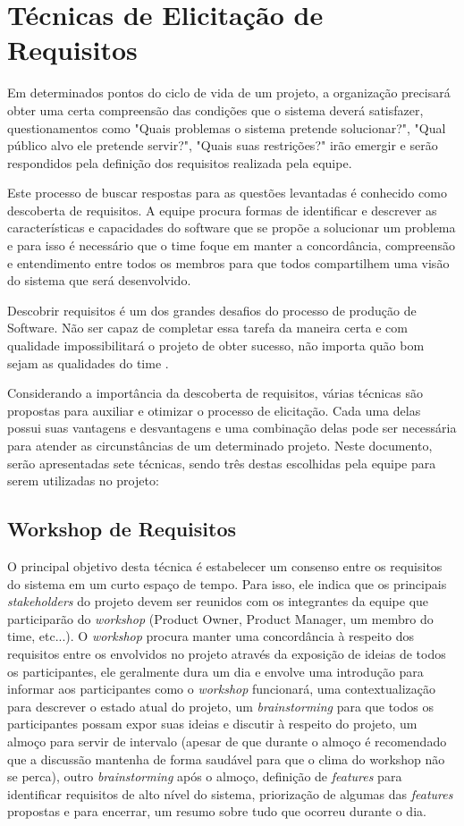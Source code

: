 \chapter[Técnicas de Elicitação de Requisitos]{Técnicas de Elicitação de Requisitos}
Em determinados pontos do ciclo de vida de um projeto, a organização precisará obter uma certa compreensão das condições que o sistema deverá satisfazer, questionamentos como "Quais problemas o sistema pretende solucionar?", "Qual público alvo ele pretende servir?", "Quais suas restrições?" irão emergir e serão respondidos pela definição dos requisitos realizada pela equipe.

Este processo de buscar respostas para as questões levantadas é conhecido como descoberta de requisitos. A equipe procura formas de identificar e descrever as características e capacidades do software que se propõe a solucionar um problema e para isso é necessário que o time foque em manter a concordância, compreensão e entendimento entre todos os membros para que todos compartilhem uma visão do sistema que será desenvolvido.

Descobrir requisitos é um dos grandes desafios do processo de produção de Software. Não ser capaz de completar essa tarefa da maneira certa e com qualidade impossibilitará o projeto de obter sucesso, não importa quão bom sejam as qualidades do time \cite[p. 227-228]{safe001}.

Considerando a importância da descoberta de requisitos, várias técnicas são propostas para auxiliar e otimizar o processo de elicitação. Cada uma delas possui suas vantagens e desvantagens e uma combinação delas pode ser necessária para atender as circunstâncias de um determinado projeto. Neste documento, serão apresentadas sete técnicas, sendo três destas escolhidas pela equipe para serem utilizadas no projeto:

\section{Workshop de Requisitos}
O principal objetivo desta técnica é estabelecer um consenso entre os requisitos do sistema em um curto espaço de tempo. Para isso, ele indica que os principais \emph{stakeholders} do projeto devem ser reunidos com os integrantes da equipe que participarão do \emph{workshop} (Product Owner, Product Manager, um membro do time, etc...). O \emph{workshop} procura manter uma concordância à respeito dos requisitos entre os envolvidos no projeto através da exposição de ideias de todos os participantes, ele geralmente dura um dia e envolve uma introdução para informar aos participantes como o \emph{workshop} funcionará, uma contextualização para descrever o estado atual do projeto, um \emph{brainstorming} para que todos os participantes possam expor suas ideias e discutir à respeito do projeto, um almoço para servir de intervalo (apesar de que durante o almoço é recomendado que a discussão mantenha de forma saudável para que o clima do workshop não se perca), outro \emph{brainstorming} após o almoço, definição de \emph{features} para identificar requisitos de alto nível do sistema, priorização de algumas das \emph{features} propostas e para encerrar, um resumo sobre tudo que ocorreu durante o dia.

